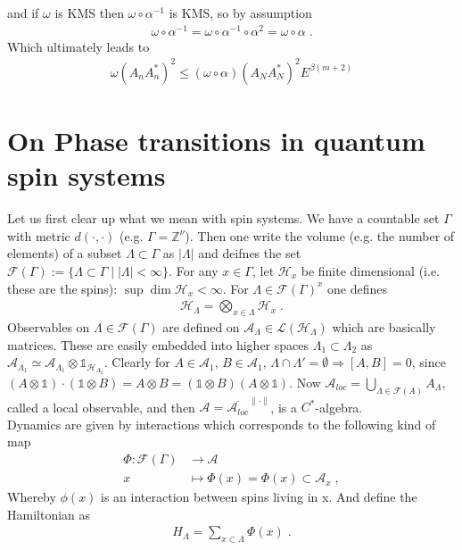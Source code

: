 \documentclass[
a4paper, %
11pt, %
onecolumn, %
openany, %
]{memoir}
\theoremstyle{definition}
\theoremstyle{remark}
\theoremstyle{plain}
\begin{document}
and if $\omega$ is KMS then $\omega\circ\alpha^{-1}$ is KMS, so by assumption \begin{align}
\omega\circ\alpha^{-1}=\omega\circ\alpha^{-1}\circ\alpha^2=\omega\circ\alpha\; .
\end{align}
Which ultimately leads to \begin{align}
\omega(A_nA_n^*)^2\leq (\omega\circ\alpha)(A_NA_N^*)^2E^{\beta(m+2)}
\end{align}
\chapter{On Phase transitions in quantum spin systems}
Let us first clear up what we mean with spin systems. We have a countable set $\Gamma$ with metric $d(\cdot,\cdot)$ (e.g. $\Gamma=\mathbb{Z}^{\nu}$). Then one write the volume (e.g. the number of elements) of a subset $\Lambda\subset\Gamma$ as $|\Lambda|$ and deifnes the set $\mathcal{F}(\Gamma):=\{\Lambda\subset\Gamma\mid |\Lambda|<\infty\}$. For any $x\in\Gamma$, let $\mathcal{H}_x$ be finite dimensional (i.e. these are the spins): $\sup\dim\mathcal{H}_x<\infty$. For $\Lambda\in\mathcal{F}(\Gamma)^x$ one defines \begin{align}
\mathcal{H}_{\Lambda}=\bigotimes_{x\in\Lambda}\mathcal{H}_x\; .
\end{align}
Observables on $\Lambda\in\mathcal{F}(\Gamma)$ are defined on $\mathcal{A}_{\Lambda}\in\mathcal{L}(\mathcal{H}_{\Lambda})$ which are basically matrices. These are easily embedded into higher spaces $\Lambda_1\subset\Lambda_2$ as $\mathcal{A}_{\Lambda_1}\simeq \mathcal{A}_{\Lambda_1}\otimes\mathds{1}_{\mathcal{H}_{\Lambda_2}}$. Clearly for $A\in\mathcal{A}_1$, $B\in\mathcal{A}_1$, $\Lambda\cap\Lambda'=\emptyset\Rightarrow[A,B]=0$, since $(A\otimes \mathds{1})\cdot(\mathds{1}\otimes B)=A\otimes B=(\mathds{1}\otimes B)(A\otimes\mathds{1})$. Now $\mathcal{A}_{loc}=\bigcup_{\Lambda\in\mathcal{F}(A)}A_{\Lambda}$, called a local observable, and then $\mathcal{A}=\overline{\mathcal{A}_{loc}}^{\|\cdot\|}$, is a $C^*$-algebra.\\
Dynamics are given by interactions which corresponds to the following kind of map \begin{align}
\Phi:\mathcal{F}(\Gamma)&\longrightarrow \mathcal{A}\\
x &\longmapsto \Phi(x)=\Phi(x)\subset \mathcal{A}_x\; ,
\end{align}
Whereby $\phi(x)$ is an interaction between spins living in x. And define the Hamiltonian as \begin{align}
H_{\Lambda}=\sum_{x\subset\Lambda}\Phi(x)\; .
\end{align}
\end{document}
